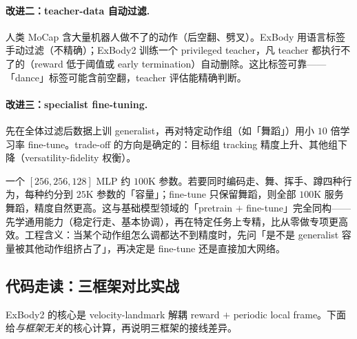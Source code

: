 \paragraph{改进二：teacher-data 自动过滤.}
人类 MoCap 含大量机器人做不了的动作（后空翻、劈叉）。ExBody 用语言标签手动过滤（不精确）；ExBody2 训练一个 privileged teacher，凡 teacher 都执行不了的（reward 低于阈值或 early termination）自动删除。这比标签可靠——「dance」标签可能含前空翻，teacher 评估能精确判断。

\paragraph{改进三：specialist fine-tuning.}
先在全体过滤后数据上训 generalist，再对特定动作组（如「舞蹈」）用小 $10$ 倍学习率 fine-tune。trade-off 的方向是确定的：目标组 tracking 精度上升、其他组下降（versatility-fidelity 权衡）。

\begin{insight}\label{ins:rlmc-wbc-capacity}
一个 $[256,256,128]$ MLP 约 $100$K 参数。若要同时编码走、舞、挥手、蹲四种行为，每种约分到 $25$K 参数的「容量」；fine-tune 只保留舞蹈，则全部 $100$K 服务舞蹈，精度自然更高。这与基础模型领域的「pretrain $+$ fine-tune」完全同构——先学通用能力（稳定行走、基本协调），再在特定任务上专精，比从零做专项更高效。工程含义：当某个动作组怎么调都达不到精度时，先问「是不是 generalist 容量被其他动作组挤占了」，再决定是 fine-tune 还是直接加大网络。
\end{insight}

\subsection{代码走读：三框架对比实战}
ExBody2 的核心是 velocity-landmark 解耦 reward $+$ periodic local frame。下面给\emph{与框架无关}的核心计算，再说明三框架的接线差异。

